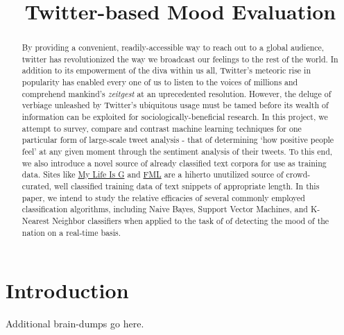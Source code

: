 \documentclass[conference]{IEEEtran}
\begin{document}
 
\title{Twitter-based Mood Evaluation}
\author{
    \and
}
\maketitle

\begin{abstract}
    By providing a convenient, readily-accessible way to reach out to a global audience, twitter has revolutionized the way we broadcast our feelings to the rest of the world. In addition to its empowerment of the diva within us all, Twitter's meteoric rise in popularity has enabled every one of us to listen to the voices of millions and comprehend mankind's \textit{zeitgest} at an uprecedented resolution. However, the deluge of verbiage unleashed by Twitter's ubiquitous usage must be tamed before its wealth of information can be exploited for sociologically-beneficial research. In this project, we attempt to survey, compare and contrast machine learning techniques for one particular form of large-scale tweet analysis - that of determining `how positive people feel' at any given moment through the sentiment analysis of their tweets. To this end, we also introduce a novel source of already classified text corpora for use as training data. Sites like \href{http://mylifeisg.com}{My Life Is G} and \href{http://fmylife.com}{FML} are a hiherto unutilized source of crowd-curated, well classified training data of text snippets of appropriate length. In this paper, we intend to study the relative efficacies of several commonly employed classification algorithms, including Naive Bayes, Support Vector Machines, and K-Nearest Neighbor classifiers when applied to the task of of detecting the mood of the nation on a real-time basis.
\end{abstract}

\section{Introduction}
Additional brain-dumps go here.
\end{document}
